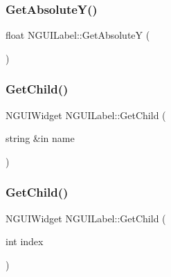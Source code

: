\hypertarget{class_n_g_u_i_label_ae973d4ccd77625e73b0e7b28fdcb89d1}{}\label{class_n_g_u_i_label_ae973d4ccd77625e73b0e7b28fdcb89d1} 
\subsubsection{\texorpdfstring{Get\+Absolute\+Y()}{GetAbsoluteY()}}
{\footnotesize\ttfamily float N\+G\+U\+I\+Label\+::\+Get\+AbsoluteY (\begin{DoxyParamCaption}{ }\end{DoxyParamCaption})}

\hypertarget{class_n_g_u_i_label_a5914d2aaa7fac4d371f0283d688515d7}{}\label{class_n_g_u_i_label_a5914d2aaa7fac4d371f0283d688515d7} 
\subsubsection{\texorpdfstring{Get\+Child()}{GetChild()}\hspace{0.1cm}{\footnotesize\ttfamily [1/2]}}
{\footnotesize\ttfamily N\+G\+U\+I\+Widget N\+G\+U\+I\+Label\+::\+Get\+Child (\begin{DoxyParamCaption}\item[{string \&in}]{name }\end{DoxyParamCaption})}

\hypertarget{class_n_g_u_i_label_a879e8b9b76af23541b1528335c3ce062}{}\label{class_n_g_u_i_label_a879e8b9b76af23541b1528335c3ce062} 
\subsubsection{\texorpdfstring{Get\+Child()}{GetChild()}\hspace{0.1cm}{\footnotesize\ttfamily [2/2]}}
{\footnotesize\ttfamily N\+G\+U\+I\+Widget N\+G\+U\+I\+Label\+::\+Get\+Child (\begin{DoxyParamCaption}\item[{int}]{index }\end{DoxyParamCaption})}

\hypertarget{class_n_g_u_i_label_a4456fdbb51dd15a559e078b314a2211f}{}\label{class_n_g_u_i_label_a4456fdbb51dd15a559e078b314a2211f} 

